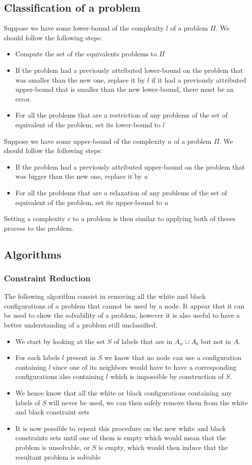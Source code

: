 \documentclass{article}
\theoremstyle{definition}
\begin{document}
\subsection{Classification of a problem}
Suppose we have some lower-bound of the complexity $l$ of a problem $\Pi$. We should follow the following steps:
\begin{itemize}
    \item Compute the set of the equivalents problems to $\Pi$
    \item If the problem had a previously attributed lower-bound on the problem that was smaller than the new one, replace it by $l$ if it had a previously attributed upper-bound that is smaller than the new lower-bound, there must be an error.
    \item For all the problems that are a restriction of any problems of the set of equivalent of the problem, set its lower-bound to $l$
\end{itemize}
Suppose we have some upper-bound of the complexity $u$ of a problem $\Pi$. We should follow the following steps:
\begin{itemize}
    \item If the problem had a previously attributed upper-bound on the problem that was bigger than the new one, replace it by $u$
    \item For all the problems that are a relaxation of any problems of the set of equivalent of the problem, set its upper-bound to $u$
\end{itemize}
Setting a complexity $c$ to a problem is then similar to applying both of theses process to the problem.
\subsection{Algorithms}
\subsubsection{Constraint Reduction}
The following algorithm consist in removing all the white and black configurations of a problem that cannot be used by a node. It appear that it can be used to show the solvability  of a problem, however it is also useful to have a better understanding of a problem still unclassified.
\begin{itemize}
    \item We start by looking at the set $S$ of labels that are in $A_w \cup A_b$ but not in $A$.
    \item For each labels $l$ present in $S$ we know that no node can use a configuration containing $l$ since one of its neighbors would have to have a corresponding configurations also containing $l$ which is impossible by construction of $S$.
    \item We hence know that all the white or black configurations containing any labels of $S$ will never be used, we can then safely remove them from the white and black constraint sets
    \item It is now possible to repeat this procedure on the new white and black constraints sets until one of them is empty which would mean that the problem is unsolvable, or $S$ is empty, which would then induce that the resultant problem is solvable
\end{itemize}
\end{document}
